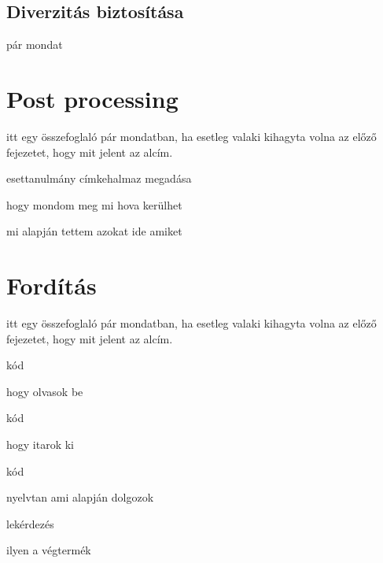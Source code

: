 \subsection{Diverzitás biztosítása}
pár mondat




\section{Post processing}
itt egy összefoglaló pár mondatban, ha esetleg valaki kihagyta volna az előző fejezetet, hogy mit jelent az alcím.

esettanulmány címkehalmaz megadása 

hogy mondom meg mi hova kerülhet

mi alapján tettem azokat ide amiket


\section{Fordítás}
itt egy összefoglaló pár mondatban, ha esetleg valaki kihagyta volna az előző fejezetet, hogy mit jelent az alcím.

kód

hogy olvasok be

kód

hogy itarok ki

kód

nyelvtan ami alapján dolgozok

lekérdezés

ilyen a végtermék


